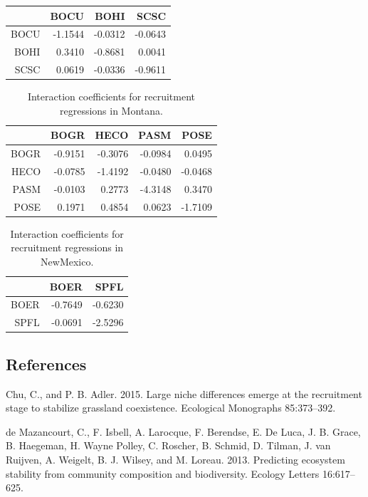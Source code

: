 \documentclass[12pt,]{article}
\begin{document}
\begin{table}[ht]
\begin{tabular}{rrrr}
  \hline
 & BOCU & BOHI & SCSC \\ 
  \hline
BOCU & -1.1544 & -0.0312 & -0.0643 \\ 
  BOHI & 0.3410 & -0.8681 & 0.0041 \\ 
  SCSC & 0.0619 & -0.0336 & -0.9611 \\ 
   \hline
\end{tabular}
\end{table}\begin{table}[ht]
\centering
\caption{Interaction coefficients for recruitment regressions in Montana.} 
\begin{tabular}{rrrrr}
  \hline
 & BOGR & HECO & PASM & POSE \\ 
  \hline
BOGR & -0.9151 & -0.3076 & -0.0984 & 0.0495 \\ 
  HECO & -0.0785 & -1.4192 & -0.0480 & -0.0468 \\ 
  PASM & -0.0103 & 0.2773 & -4.3148 & 0.3470 \\ 
  POSE & 0.1971 & 0.4854 & 0.0623 & -1.7109 \\ 
   \hline
\end{tabular}
\end{table}\begin{table}[ht]
\centering
\caption{Interaction coefficients for recruitment regressions in NewMexico.} 
\begin{tabular}{rrr}
  \hline
 & BOER & SPFL \\ 
  \hline
BOER & -0.7649 & -0.6230 \\ 
  SPFL & -0.0691 & -2.5296 \\ 
   \hline
\end{tabular}
\end{table}

\newpage{}

\subsection*{References}\label{references}

Chu, C., and P. B. Adler. 2015. Large niche differences emerge at the
recruitment stage to stabilize grassland coexistence. Ecological
Monographs 85:373--392.

{{de Mazancourt}}, C., F. Isbell, A. Larocque, F. Berendse, E. {De
Luca}, J. B. Grace, B. Haegeman, H. {Wayne Polley}, C. Roscher, B.
Schmid, D. Tilman, J. van Ruijven, A. Weigelt, B. J. Wilsey, and M.
Loreau. 2013. Predicting ecosystem stability from community composition
and biodiversity. Ecology Letters 16:617--625.
\end{document}
